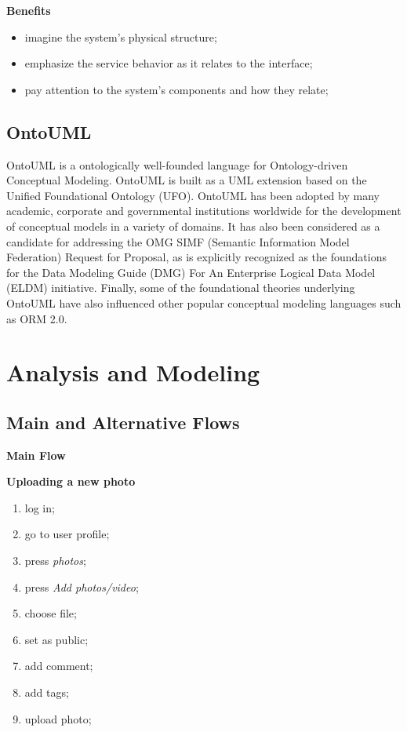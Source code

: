 \documentclass{article}
\begin{document}
			\textbf{Benefits}
			\begin{itemize}
				\item imagine the system’s physical structure;
				
				\item emphasize the service behavior as it relates to the interface;
				
				\item pay attention to the system’s components and how they relate;
			\end{itemize}

		\subsection{OntoUML}
			OntoUML is a ontologically well-founded language for Ontology-driven Conceptual Modeling. OntoUML is built as a UML extension based on the Unified Foundational Ontology (UFO). OntoUML has been adopted by many academic, corporate and governmental institutions worldwide for the development of conceptual models in a variety of domains. It has also been considered as a candidate for addressing the OMG SIMF (Semantic Information Model Federation) Request for Proposal, as is explicitly recognized as the foundations for the Data Modeling Guide (DMG) For An Enterprise Logical Data Model (ELDM) initiative. Finally, some of the foundational theories underlying OntoUML have also influenced other popular conceptual modeling languages such as ORM 2.0.

	\section{Analysis and Modeling}
		\subsection{Main and Alternative Flows}
			\begin{center}
				\textbf{Main Flow}
			\end{center}

				\textbf{Uploading a new photo}
				\begin{enumerate}
					\item log in;
					\item go to user profile;
					\item press \textit{photos};
					\item press \textit{Add photos/video};
					\item choose file;
					\item set as public;
					\item add comment;
					\item add tags;
					\item upload photo;
				\end{enumerate}
\end{document}

